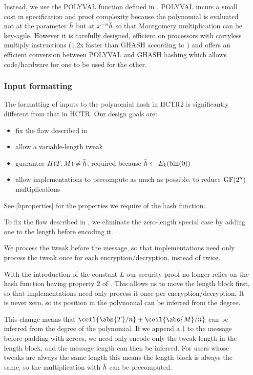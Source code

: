 \documentclass[hctr2.tex]{subfiles}
\begin{document}
Instead, we use the POLYVAL function
defined in \cite{aes_gcm_siv,aes_gcm_siv_rfc}.
POLYVAL incurs a small cost in specification and proof complexity because 
the polynomial is evaluated not at the parameter \(\bar{h}\)
but at \(x^{-n}\bar{h}\)
so that Montgomery multiplication\cite{montmul} can be key-agile.
However it is carefully designed, efficient
on processors with carryless multiply instructions
(1.2x faster than GHASH according to \cite{aes_gcm_siv})
and offers an efficient conversion between POLYVAL and GHASH hashing
which allows code/hardware for one to be used for the other.

\subsubsection{Input formatting}\label{inputformatting}

The formatting of inputs to the polynomial hash in HCTR2 is significantly
different from that in HCTR. Our design goals are:

\begin{itemize}
    \item fix the flaw described in \cite{kumarhctr}
    \item allow a variable-length tweak
    \item guarantee \(H(T, M) \neq \bar{h}\), required
    because \(\bar{h} \gets E_k(\operatorname{bin}(0))\)
    \item allow implementations to precompute as much as possible, to reduce \(\operatorname{GF}(2^n)\) multiplications
\end{itemize}

See \autoref{hproperties}
for the properties we require of the hash function.

To fix the flaw described in \cite{kumarhctr},
we eliminate the zero-length special case
by adding one to the length before encoding it.

We process the tweak before the message, so that implementations need only
process the tweak once for each encryption/decryption, instead of twice.

With the introduction of the constant \(L\)
our security proof no longer relies on the hash function
having property 2 of \cite[Section~3.3]{hctr}.
This allows us to move the length block first, so
that implementations need only process it once per encryption/decryption.
It is never zero, so its position in the
polynomial can be inferred from the degree.

This change means that \(\ceil{\abs{T}/n} + \ceil{\abs{M}/n}\)
can be inferred from the degree of the polynomial.  
If we append a 1 to the message before padding with zeroes,
we need only encode only the tweak length in the length block,
and the message length can then be inferred.
For users whose tweaks are always the same length
this means the length block is always the same, 
so the multiplication with \(h\) can be
precomputed.
\end{document}
